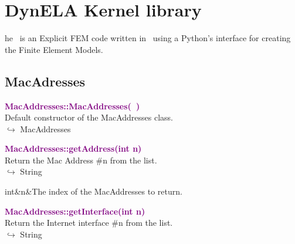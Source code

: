 %
%
%
\chapter{DynELA Kernel library}

\startcontents[chapters]
\printmyminitoc[2]he \DynELA~is an Explicit FEM code written in \Cpp~using a Python's interface for creating the Finite Element Models. 

\section{MacAdresses}

\textcolor{purple}{\textbf{MacAddresses::MacAddresses(~)}}\label{MacAddresses::MacAddresses()}\\
Default constructor of the MacAddresses class.\\ \hspace*{10mm}$\hookrightarrow$ MacAddresses


\textcolor{purple}{\textbf{MacAddresses::getAddress(int n)}}\label{MacAddresses::getAddress(int n)}\\
Return the Mac Address \#n from the list.\\ \hspace*{10mm}$\hookrightarrow$ String

\begin{tcolorbox}[width=\textwidth,myArgs,tabularx={ll|R},title=Arguments of MacAddresses::getAddress]
int&n&The index of the MacAddresses to return.
\end{tcolorbox}


\textcolor{purple}{\textbf{MacAddresses::getInterface(int n)}}\label{MacAddresses::getInterface(int n)}\\
Return the Internet interface \#n from the list.\\ \hspace*{10mm}$\hookrightarrow$ String

